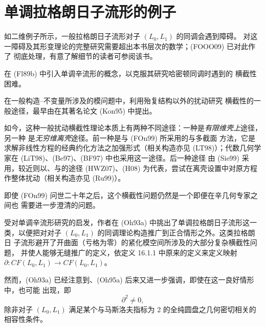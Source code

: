 \section{单调拉格朗日子流形的例子}
\label{sec:examples-monotone-lagrangians}

如二维例子所示，一般拉格朗日子流形对子 $(L_0,L_1)$ 的\personFloer{}同调会遇到障碍。
对这一障碍及其形变理论的完整研究需要超出本书层次的数学；(FOOO09) 已对此作了
彻底处理，有意了解细节的读者可参阅该书。

\personFloer{}在 (Fl89b) 中引入单调辛流形的概念，以克服其研究哈密顿\personFloer{}同调时遇到的
横截性困难。

\begin{remark}
\label{rem:general-perturbation-transversality}
在一般构造\personGromov{}--\personWitten{}不变量所涉及的模问题中，利用殆复结构以外的扰动研究
横截性的一般途径，最早由\personKontsevich{}在其著名论文 (Kon95) 中提出。

如今，这种一般扰动横截性理论本质上有两种不同途径：一种是\emph{有限维壳上}途径，另一种
是\emph{无穷维离壳}途径。前一种是\personFukaya{}与\personOno{} (FOn99) 所采用的\termKuranishiStructure{}与多截面
方法，它是求解非线性方程的经典\personLyapunov{}约化方法之加强形式（相关构造亦见
(LT98)）；代数几何学家在 (LiT98)、(Be97)、(BF97) 中也采用这一途径。后一种途径
由\personBerndSiebert{} (Sie99) 采用，较近则以\personHofer{}、\personKrzysztofWysocki{}与\personZehnder{}的\termPolyfold{}途径
(HWZ07)、(H08) 为代表，尝试在离壳设置中对原方程作整体扰动（相关构造亦见
(Ru99)）。

即使 (FOn99) 问世二十年之后，这个横截性问题仍然是一个即便在辛几何专家之间也
需要进一步澄清的问题。
\end{remark}

受\personFloer{}对单调辛流形研究的启发，作者在 (Oh93a) 中挑出了单调拉格朗日子流形这一
类，以便把\personFloer{}对对子 $(L_0,L_1)$ 的同调理论构造推广到正合情形之外。这类拉格朗日
子流形避开了开\personRiemann{}曲面（亏格为零）的紧化模空间所涉及的大部分复杂横截性问题，
并使人能够无缝推广\personFloer{}的定义，依定义 16.1.1 中\personFloer{}原来的定义来定义映射
$\partial:CF(L_0,L_1)\to CF(L_0,L_1)$。

然而，(Oh93a) 已经注意到、(Oh95a) 后来又进一步强调，即使在这一良好情形中，也可能
出现\termAnomaly{}，即
\begin{equation}
 \partial^2\neq0,
\label{eq:monotone-boundary-anomaly}
\end{equation}
除非对子 $(L_0,L_1)$ 满足某个与马斯洛夫指标为 $2$ 的全纯圆盘之几何密切相关的
相容性条件。

